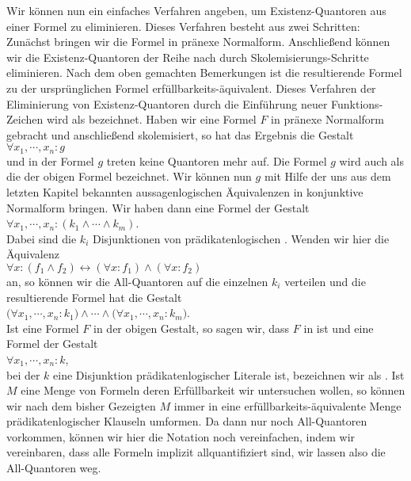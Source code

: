 Wir können nun ein einfaches Verfahren angeben, um Existenz-Quantoren aus einer Formel
zu eliminieren.  Dieses Verfahren besteht aus zwei Schritten:  Zunächst bringen wir die Formel
in pränexe Normalform. Anschließend können wir die Existenz-Quantoren der Reihe nach durch \linebreak
Skolemisierungs-Schritte eliminieren.  Nach dem oben gemachten Bemerkungen ist die resultierende 
Formel zu der ursprünglichen Formel erfüllbarkeits-äquivalent.  Dieses
Verfahren der Eliminierung von Existenz-Quantoren durch die Einführung neuer
Funktions-Zeichen wird als  bezeichnet.  Haben wir eine Formel $F$
in pränexe Normalform gebracht und anschließend skolemisiert, so hat das Ergebnis die Gestalt\\[0.2cm]
\hspace*{1.3cm} $\forall x_1, \cdots, x_n: g$ \\[0.2cm]
und in der Formel $g$ treten keine Quantoren mehr auf.  Die Formel $g$ wird auch als die
 der obigen Formel bezeichnet.  Wir können nun  $g$ mit Hilfe
der uns aus dem letzten Kapitel bekannten aussagenlogischen
 Äquivalenzen in konjunktive Normalform bringen.  Wir haben dann eine
Formel der Gestalt \\[0.2cm]
\hspace*{1.3cm} $\forall x_1, \cdots, x_n: (k_1 \wedge \cdots \wedge k_m)$. \\[0.2cm]
Dabei sind die $k_i$ Disjunktionen von prädikatenlogischen .  Wenden wir
hier  die Äquivalenz 
\\[0.2cm]
\hspace*{1.3cm}
$\forall x\colon (f_1\wedge f_2) \leftrightarrow (\forall x\colon f_1) \wedge (\forall x\colon f_2)$
\\[0.2cm]
an, so können wir die All-Quantoren auf die einzelnen $k_i$ verteilen und
die resultierende Formel hat die Gestalt \\[0.2cm]
\hspace*{1.3cm} 
$\big(\forall x_1, \cdots, x_n: k_1\big) \wedge \cdots \wedge \big(\forall x_1, \cdots, x_n: k_m\big)$. \\[0.2cm]
Ist eine Formel $F$ in der obigen
Gestalt, so sagen wir, dass $F$ in 
  ist und eine Formel der Gestalt \\[0.2cm]
\hspace*{1.3cm} $\forall x_1, \cdots, x_n: k$, \\[0.2cm]
bei der $k$ eine Disjunktion prädikatenlogischer Literale ist,
bezeichnen wir als .   Ist $M$
eine Menge von Formeln deren Erfüllbarkeit wir untersuchen wollen, so können wir nach dem
bisher Gezeigten  $M$ immer in eine erfüllbarkeits-äquivalente Menge prädikatenlogischer Klauseln umformen.
Da  dann nur noch All-Quantoren vorkommen, können wir hier die  Notation noch vereinfachen,
indem wir vereinbaren, dass alle Formeln implizit allquantifiziert sind, wir lassen also
die All-Quantoren weg.

